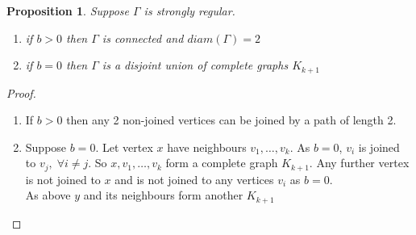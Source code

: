 \documentclass[]{article}
\newtheorem{prop}[thm]{Proposition}
\theoremstyle{definition}
\theoremstyle{remark}
\numberwithin{equation}{section}
\begin{document}
	\begin{prop} Suppose $\Gamma$ is strongly regular.
		\begin{enumerate}
			\item if $b > 0$ then $\Gamma$ is connected and $diam(\Gamma) = 2$
			\item if $b = 0$ then $\Gamma$ is a disjoint union of complete graphs $K_{k+1}$
		\end{enumerate}
	\end{prop}

	\begin{proof}
		\begin{enumerate}
			\item If $b>0$ then any 2 non-joined vertices can be joined by a path of length 2.
			\item Suppose $b=0$. Let vertex $x$ have neighbours $v_1,\hdots,v_k$. As $b=0$, $v_i$ is joined to $v_j,\;\forall i\neq j$. So $x,v_1,\hdots,v_k$ form a complete graph $K_{k+1}$. Any further vertex is not joined to $x$ and is not joined to any vertices $v_i$ as $b=0$.\\
			As above $y$ and its neighbours form another $K_{k+1}$
		\end{enumerate}
	\end{proof}
\end{document}
